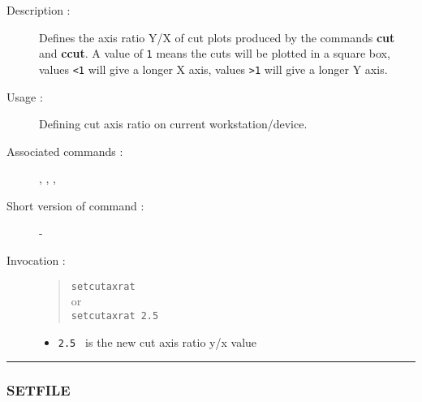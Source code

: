 \begin{description}

\item[Description :] Defines the axis ratio Y/X of cut plots produced
by the commands {\bf cut} and {\bf ccut}.  A value of {\tt 1} means the
cuts will be plotted in a square box, values \verb+<1+ will give a
longer X axis, values \verb+>1+  will give a longer Y axis.

\item[Usage :] Defining cut axis ratio on current workstation/device.

\item[Associated commands :] {\tt {}}, 
{\tt {}}, {\tt {}}, 
{\tt {}}

\item[Short version of command :] -
\item[Invocation :]

\begin{quote}{\tt  setcutaxrat }\\
or \\
{\tt setcutaxrat 2.5 }
\end{quote}

\begin{itemize}

\item {\tt 2.5 } is the new cut axis ratio y/x value
\end{itemize}

\end{description}

\hrule 
\subsubsection*{\label{SETFILE}SETFILE}

